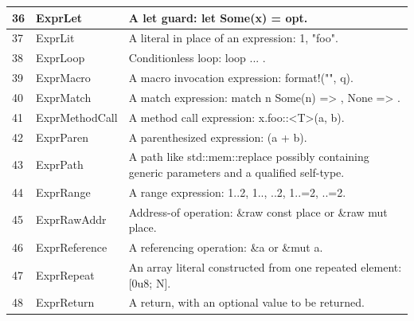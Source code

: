 \begin{longtable}{| p{} | p{} | p{} |}
36    & ExprLet                        & A let guard: let Some(x) = opt.                                                                                \\ \hline
37    & ExprLit                        & A literal in place of an expression: 1, "foo".                                                                 \\ \hline
38    & ExprLoop                       & Conditionless loop: loop { ... }.                                                                              \\ \hline
39    & ExprMacro                      & A macro invocation expression: format!("{}", q).                                                               \\ \hline
40    & ExprMatch                      & A match expression: match n { Some(n) => {}, None => {} }.                                                     \\ \hline
41    & ExprMethodCall                 & A method call expression: x.foo::<T>(a, b).                                                                    \\ \hline
42    & ExprParen                      & A parenthesized expression: (a + b).                                                                           \\ \hline
43    & ExprPath                       & A path like std::mem::replace possibly containing generic parameters and a qualified self-type.                \\ \hline
44    & ExprRange                      & A range expression: 1..2, 1.., ..2, 1..=2, ..=2.                                                               \\ \hline
45    & ExprRawAddr                    & Address-of operation: \&raw const place or \&raw mut place.                                                      \\ \hline
46    & ExprReference                  & A referencing operation: \&a or \&mut a.                                                                         \\ \hline
47    & ExprRepeat                     & An array literal constructed from one repeated element: [0u8; N].                                              \\ \hline
48    & ExprReturn                     & A return, with an optional value to be returned.                                                               \\ \hline

\end{longtable}
